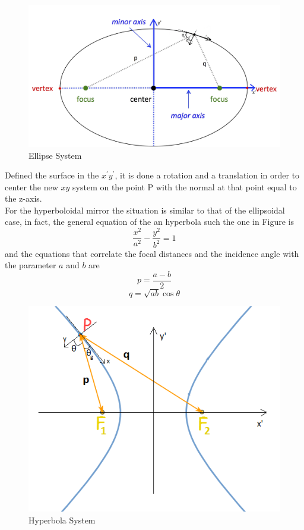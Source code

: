 %
\begin{figure}[H]
%
\centering
%
\includegraphics[width=.8\textwidth]{Immagini/Chapter3/EllipseSystem3}
%
\caption{Ellipse System}
%
\label{fig: ellipse}
%
\end{figure}
%
Defined the surface in the $x^{'}y^{'} $, it is done a rotation and a translation in order to center the new $xy $ system on the point P with the normal at that point equal to the z-axis.
\\
For the hyperboloidal mirror the situation is similar to that of the ellipsoidal case, in fact, the general equation of the an hyperbola such the one in Figure is 
%
\begin{equation}
\frac{x^2}{a^2} - \frac{y^2}{b^2} = 1
\end{equation}
%
and the equations that correlate the focal distances and the incidence angle with the parameter $a $ and $b $ are
%
\begin{equation}
p = \frac{a - b}{2}
\label{eq: 1stHypEq}
\end{equation}
%
\begin{equation}
q = \sqrt{ab} \cos\theta
\label{eq: 2ndHypEq}
\end{equation}
%
\begin{figure}[H]
%
\centering
%
\includegraphics[width=.5\textwidth]{Immagini/Chapter3/Hyperbola}
%
\caption{Hyperbola System}
%
\label{fig: hyperbola}
%
\end{figure}
